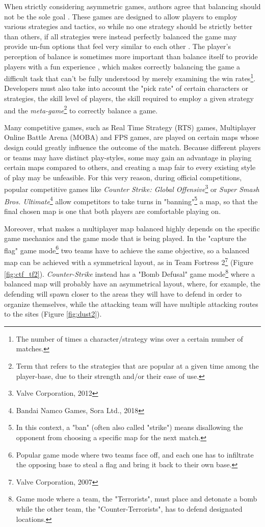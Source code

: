 When strictly considering asymmetric games, authors agree that balancing should not be the sole goal \cite{sirlin_balancing_2014} \cite{portwnow_perfect_2012} \cite{brown_how_2019}. These games are designed to allow players to employ various strategies and tactics, so while no one strategy should be strictly better than others, if all strategies were instead perfectly balanced the game may provide un-fun options that feel very similar to each other \cite{sakurai_amplify_2024}. The player's perception of balance is sometimes more important than balance itself to provide players with a fun experience \cite{brown_how_2019}, which makes correctly balancing the game a difficult task that can't be fully understood by merely examining the win rates\footnote{The number of times a character/strategy wins over a certain number of matches.}. Developers must also take into account the "pick rate" of certain characters or strategies, the skill level of players, the skill required to employ a given strategy and the \textit{meta-game}\footnote{Term that refers to the strategies that are popular at a given time among the player-base, due to their strength and/or their ease of use.} to correctly balance a game. \cite{brown_how_2019} 

Many competitive games, such as Real Time Strategy (RTS) games, Multiplayer Online Battle Arena (MOBA) and FPS games, are played on certain maps whose design could greatly influence the outcome of the match. Because different players or teams may have distinct play-styles, some may gain an advantage in playing certain maps compared to others, and creating a map fair to every existing style of play may be unfeasible. For this very reason, during official competitions, popular competitive games like \textit{Counter Strike: Global Offensive}\footnote{Valve Corporation, 2012} or \textit{Super Smash Bros. Ultimate}\footnote{Bandai Namco Games, Sora Ltd., 2018} allow competitors to take turns in "banning"\footnote{In this context, a "ban" (often also called "strike") means disallowing the opponent from choosing a specific map for the next match.} a map, so that the final chosen map is one that both players are comfortable playing on.

Moreover, what makes a multiplayer map balanced highly depends on the specific game mechanics and the game mode that is being played. In the "capture the flag" game mode\footnote{Popular game mode where two teams face off, and each one has to infiltrate the opposing base to steal a flag and bring it back to their own base.} two teams have to achieve the same objective, so a balanced map can be achieved with a symmetrical layout, as in Team Fortress 2\footnote{Valve Corporation, 2007} (Figure \cref{fig:ctf_tf2}). \textit{Counter-Strike} instead has a "Bomb Defusal" game mode\footnote{Game mode where a team, the "Terrorists", must place and detonate a bomb while the other team, the "Counter-Terrorists", has to defend designated locations.} where a balanced map will probably have an asymmetrical layout, where, for example, the defending will spawn closer to the areas they will have to defend in order to organize themselves, while the attacking team will have multiple attacking routes to the sites (Figure \cref{fig:dust2}).

